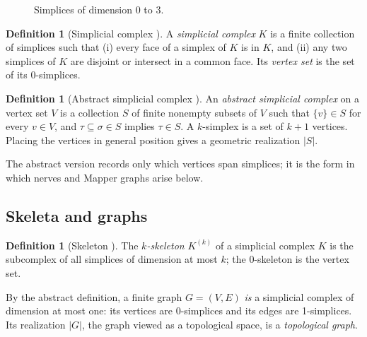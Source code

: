 \documentclass{article}
\theoremstyle{definition}
\newtheorem{definition}[theorem]{Definition}
\theoremstyle{remark}
\begin{document}
\begin{figure}[htbp]
\centering
{}
\caption{Simplices of dimension 0 to 3.}\label{fig:simplices}
\end{figure}

\begin{definition}[Simplicial complex {\parencite{edelsbrunnerletscherzomorodian2002}}]
A \emph{simplicial complex} $K$ is a finite collection of simplices such that (i) every face of a simplex of $K$ is in $K$, and (ii) any two simplices of $K$ are disjoint or intersect in a common face.
Its \emph{vertex set} is the set of its 0-simplices.
\end{definition}

\begin{definition}[Abstract simplicial complex {\parencite{zomorodiancarlsson2005}}]
An \emph{abstract simplicial complex} on a vertex set $V$ is a collection $S$ of finite nonempty subsets of $V$ such that $\{v\} \in S$ for every $v \in V$, and $\tau \subseteq \sigma \in S$ implies $\tau \in S$.
A $k$-simplex is a set of $k+1$ vertices. Placing the vertices in general position gives a geometric realization $|S|$.
\end{definition}
The abstract version records only which vertices span simplices; it is the form in which nerves and Mapper graphs arise below.

\subsection{Skeleta and graphs}
\begin{definition}[Skeleton {\parencite{edelsbrunnerharerpatel2008}}]
The \emph{$k$-skeleton} $K^{(k)}$ of a simplicial complex $K$ is the subcomplex of all simplices of dimension at most $k$; the 0-skeleton is the vertex set.
\end{definition}
By the abstract definition, a finite graph $G = (V, E)$ \emph{is} a simplicial complex of dimension at most one: its vertices are 0-simplices and its edges are 1-simplices.
Its realization $|G|$, the graph viewed as a topological space, is a \emph{topological graph}.
\end{document}

